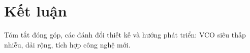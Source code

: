 \chapter{Kết luận}
Tóm tắt đóng góp, các đánh đổi thiết kế và hướng phát triển: VCO siêu thấp nhiễu, dải rộng, tích hợp công nghệ mới.


